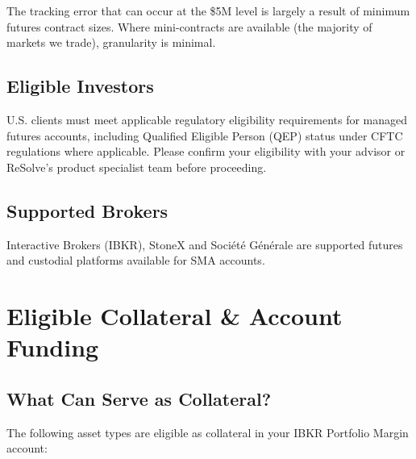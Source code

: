 \documentclass{resolve-whitepaper}
\begin{document}
The tracking error that can occur at the \$5M level is largely a result
of minimum futures contract sizes. Where mini-contracts are available
(the majority of markets we trade), granularity is minimal.

\subsection{Eligible Investors}\label{eligible-investors}

U.S. clients must meet applicable regulatory eligibility requirements
for managed futures accounts, including Qualified Eligible Person (QEP)
status under CFTC regulations where applicable. Please confirm your
eligibility with your advisor or ReSolve's product specialist team
before proceeding.

\subsection{Supported Brokers}\label{supported-brokers}

Interactive Brokers (IBKR), StoneX and Société Générale are supported
futures and custodial platforms available for SMA accounts.

\sectionpagebreak

\section{Eligible Collateral \& Account
Funding}\label{eligible-collateral-account-funding}

\subsection{What Can Serve as
Collateral?}\label{what-can-serve-as-collateral}

The following asset types are eligible as collateral in your IBKR
Portfolio Margin account:
\end{document}
